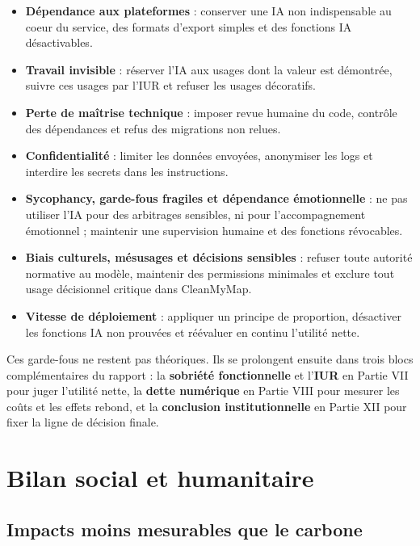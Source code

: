 \documentclass[
  10pt,
  a4paper,
  DIV=11,
  numbers=noendperiod,
  oneside]{scrreprt}
\providecommand{\tightlist}{%
  \setlength{\itemsep}{0pt}\setlength{\parskip}{0pt}}
\let\oldtextbf\textbf
\renewcommand{\textbf}[1]{\oldtextbf{\textcolor{cmmnavy}{#1}}}
\begin{document}
\begin{itemize}
\tightlist
\item
  \textbf{Dépendance aux plateformes} : conserver une IA non
  indispensable au coeur du service, des formats d'export simples et des
  fonctions IA désactivables.
\item
  \textbf{Travail invisible} : réserver l'IA aux usages dont la valeur
  est démontrée, suivre ces usages par l'IUR et refuser les usages
  décoratifs.
\item
  \textbf{Perte de maîtrise technique} : imposer revue humaine du code,
  contrôle des dépendances et refus des migrations non relues.
\item
  \textbf{Confidentialité} : limiter les données envoyées, anonymiser
  les logs et interdire les secrets dans les instructions.
\item
  \textbf{Sycophancy, garde-fous fragiles et dépendance émotionnelle} :
  ne pas utiliser l'IA pour des arbitrages sensibles, ni pour
  l'accompagnement émotionnel ; maintenir une supervision humaine et des
  fonctions révocables.
\item
  \textbf{Biais culturels, mésusages et décisions sensibles} : refuser
  toute autorité normative au modèle, maintenir des permissions
  minimales et exclure tout usage décisionnel critique dans CleanMyMap.
\item
  \textbf{Vitesse de déploiement} : appliquer un principe de proportion,
  désactiver les fonctions IA non prouvées et réévaluer en continu
  l'utilité nette.
\end{itemize}

Ces garde-fous ne restent pas théoriques. Ils se prolongent ensuite dans
trois blocs complémentaires du rapport : la \textbf{sobriété
fonctionnelle} et l'\textbf{IUR} en Partie VII pour juger l'utilité
nette, la \textbf{dette numérique} en Partie VIII pour mesurer les coûts
et les effets rebond, et la \textbf{conclusion institutionnelle} en
Partie XII pour fixer la ligne de décision finale.

\section{Bilan social et humanitaire}\label{bilan-social-et-humanitaire}

\subsection{Impacts moins mesurables que le
carbone}\label{impacts-moins-mesurables-que-le-carbone}
\end{document}
